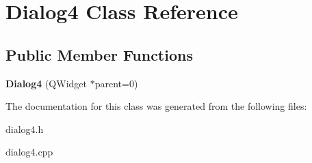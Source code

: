\hypertarget{classDialog4}{\section{\-Dialog4 \-Class \-Reference}
\label{classDialog4}
}
\subsection*{\-Public \-Member \-Functions}
\begin{DoxyCompactItemize}
\item 
\hypertarget{classDialog4_a3176f94eb6d8e4f8c01b4ba03015abe2}{{\bfseries \-Dialog4} (\-Q\-Widget $\ast$parent=0)}\label{classDialog4_a3176f94eb6d8e4f8c01b4ba03015abe2}

\end{DoxyCompactItemize}


\-The documentation for this class was generated from the following files\-:\begin{DoxyCompactItemize}
\item 
dialog4.\-h\item 
dialog4.\-cpp\end{DoxyCompactItemize}
